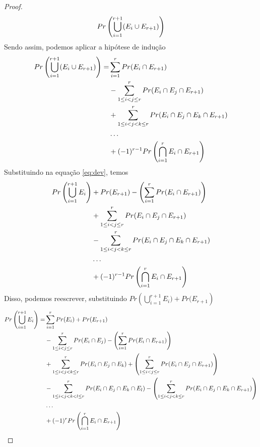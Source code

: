 \documentclass{article}
\begin{document}
\begin{proof}
    \begin{equation}
        \notag
        Pr\left(\bigcup_{i = 1}^{r+1}(E_i \cup E_{r+1})\right)
    \end{equation}
    Sendo assim, podemos aplicar a hipótese de indução
    \begin{equation}
    \notag
        \begin{split}
            Pr\left(\bigcup_{i = 1}^{r+1}(E_i \cup E_{r+1})\right) =& \sum\limits_{i=1}^{r}Pr(E_i \cap E_{r+1})\\
            & -\sum\limits_{1\leq i<j\leq r}^{r}Pr(E_i \cap E_j \cap E_{r+1})\\
            & +\sum\limits_{1\leq i<j<k\leq r}^{r}Pr(E_i \cap E_j \cap E_k \cap E_{r+1})\\
            & \ldots\\
            & +(-1)^{r-1}Pr\left(\bigcap_{i=1}^{r}E_i \cap E_{r+1}\right)
        \end{split}
    \end{equation}
    Substituindo na equação \ref{eq:dev}, temos
    \begin{equation}
    \notag
        \begin{split}
            Pr\left(\bigcup_{i = 1}^{r+1}E_i\right)& + Pr(E_{r+1}) - \left(\sum\limits_{i=1}^{r}Pr(E_i \cap E_{r+1})\right)\\
            & +\sum\limits_{1\leq i<j\leq r}^{r}Pr(E_i \cap E_j \cap E_{r+1})\\
            & -\sum\limits_{1\leq i<j<k\leq r}^{r}Pr(E_i \cap E_j \cap E_k \cap E_{r+1})\\
            & \ldots\\
            & +(-1)^{r-1}Pr\left(\bigcap_{i=1}^{r}E_i \cap E_{r+1}\right)
        \end{split}
    \end{equation}
    Disso, podemos reescrever, substituindo $Pr\left(\bigcup_{i = 1}^{r+1}E_i) + Pr(E_{r+1}\right)$
    \begin{equation}
    \notag
        \begin{split}
            Pr\left(\bigcup_{i = 1}^{r+1}E_i\right) =& \sum\limits_{i=1}^{r}Pr(E_i) + Pr(E_{r+1})\\
            & -\sum\limits_{1\leq i<j\leq r}^{r}Pr(E_i \cap E_j) - \left(\sum\limits_{i=1}^{r}Pr(E_i \cap E_{r+1})\right)\\
            & +\sum\limits_{1\leq i<j<k\leq r}^{r}Pr(E_i \cap E_j \cap E_k) + \left(\sum\limits_{1\leq i<j\leq r}^{r}Pr(E_i \cap E_j \cap E_{r+1})\right)\\
            & -\sum\limits_{1\leq i<j<k<l\leq r}^{r}Pr(E_i \cap E_j \cap E_k \cap E_l) - \left(\sum\limits_{1\leq i<j<k\leq r}^{r}Pr(E_i \cap E_j \cap E_k \cap E_{r+1})\right)\\
            & \ldots\\
            & +(-1)^{r}Pr\left(\bigcap_{i=1}^{r}E_i \cap E_{r+1}\right)
        \end{split}
    \end{equation}
\end{proof}
\end{document}
